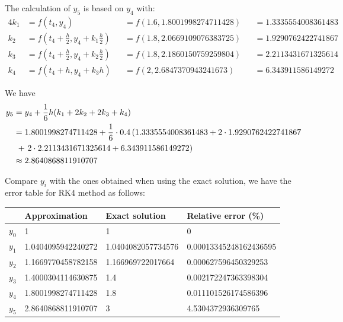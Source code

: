 \documentclass[a4paper]{article}
\begin{document}
The calculation of \(y_5\) is based on \(y_4\) with:
\begin{alignat*}{4}
  k_1 & = f(t_4, y_4)                                            &  & = f(1.6, 1.8001998274711428) &  & = 1.3335554008361483 \\
  k_2 & = f \left(t_4 + \frac{h}{2}, y_4 + k_1\frac{h}{2}\right) &  & = f(1.8, 2.0669109076383725) &  & = 1.9290762422741867 \\
  k_3 & = f \left(t_4 + \frac{h}{2}, y_4 + k_2\frac{h}{2}\right) &  & = f(1.8, 2.1860150759259804) &  & = 2.2113431671325614 \\
  k_4 & = f(t_4 + h, y_4 + k_3h)                                 &  & = f(2, 2.6847370943241673)   &  & = 6.343911586149272
\end{alignat*}

We have
\begin{align*}
  y_5 & = y_4 + \frac{1}{6}h(k_1 + 2k_2 + 2k_3 + k_4)                                                            \\
      & = 1.8001998274711428 + \frac{1}{6} \cdot 0.4\left(1.3335554008361483 + 2 \cdot 1.9290762422741867\right. \\
      & \;\left.+\ 2 \cdot 2.2113431671325614 + 6.343911586149272\vphantom{1}\right)                             \\
      & \approx 2.8640868811910707
\end{align*}

Compare \(y_i\) with the ones obtained when using the exact solution, we have the error table for RK4 method as follows:

\begin{table}[h]
  \centering
  \begin{tabular}{|l|l|l|l|}
    \hline
            & Approximation      & Exact solution     & Relative error (\%)    \\
    \hline
    \(y_0\) & 1                  & 1                  & 0                      \\
    \hline
    \(y_1\) & 1.0404095942240272 & 1.0404082057734576 & 0.00013345248162436595 \\
    \hline
    \(y_2\) & 1.1669770458782158 & 1.166969722017664  & 0.000627596450329253   \\
    \hline
    \(y_3\) & 1.4000304114630875 & 1.4                & 0.002172247363398304   \\
    \hline
    \(y_4\) & 1.8001998274711428 & 1.8                & 0.011101526174586396   \\
    \hline
    \(y_5\) & 2.8640868811910707 & 3                  & 4.5304372936309765     \\
    \hline
  \end{tabular}
\end{table}
\end{document}
